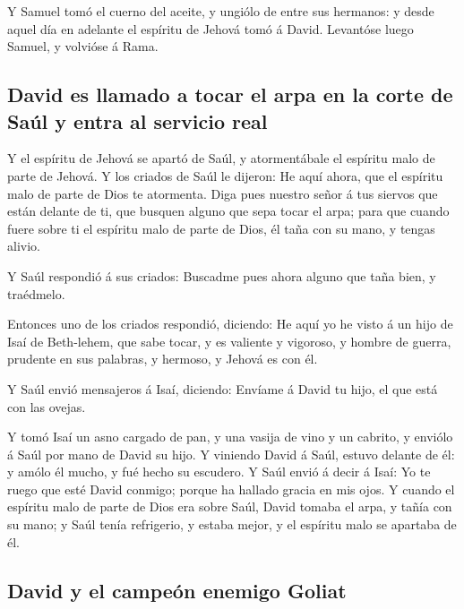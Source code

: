  Y Samuel tomó el cuerno del aceite, y ungiólo de entre sus
hermanos: y desde aquel día en adelante el espíritu de Jehová tomó á
David. Levantóse luego Samuel, y volvióse á Rama.

\hypertarget{david-es-llamado-a-tocar-el-arpa-en-la-corte-de-sauxfal-y-entra-al-servicio-real}{%
\subsection{David es llamado a tocar el arpa en la corte de Saúl y entra
al servicio
real}\label{david-es-llamado-a-tocar-el-arpa-en-la-corte-de-sauxfal-y-entra-al-servicio-real}}

 Y el espíritu de Jehová se apartó de Saúl, y atormentábale
el espíritu malo de parte de Jehová.  Y los criados de Saúl
le dijeron: He aquí ahora, que el espíritu malo de parte de Dios te
atormenta.  Diga pues nuestro señor á tus siervos que están
delante de ti, que busquen alguno que sepa tocar el arpa; para que
cuando fuere sobre ti el espíritu malo de parte de Dios, él taña con su
mano, y tengas alivio.

 Y Saúl respondió á sus criados: Buscadme pues ahora alguno
que taña bien, y traédmelo.

 Entonces uno de los criados respondió, diciendo: He aquí
yo he visto á un hijo de Isaí de Beth-lehem, que sabe tocar, y es
valiente y vigoroso, y hombre de guerra, prudente en sus palabras, y
hermoso, y Jehová es con él.

 Y Saúl envió mensajeros á Isaí, diciendo: Envíame á David
tu hijo, el que está con las ovejas.

 Y tomó Isaí un asno cargado de pan, y una vasija de vino y
un cabrito, y enviólo á Saúl por mano de David su hijo.  Y
viniendo David á Saúl, estuvo delante de él: y amólo él mucho, y fué
hecho su escudero.  Y Saúl envió á decir á Isaí: Yo te
ruego que esté David conmigo; porque ha hallado gracia en mis ojos.
 Y cuando el espíritu malo de parte de Dios era sobre Saúl,
David tomaba el arpa, y tañía con su mano; y Saúl tenía refrigerio, y
estaba mejor, y el espíritu malo se apartaba de él.

\hypertarget{david-y-el-campeuxf3n-enemigo-goliat}{%
\subsection{David y el campeón enemigo
Goliat}\label{david-y-el-campeuxf3n-enemigo-goliat}}

